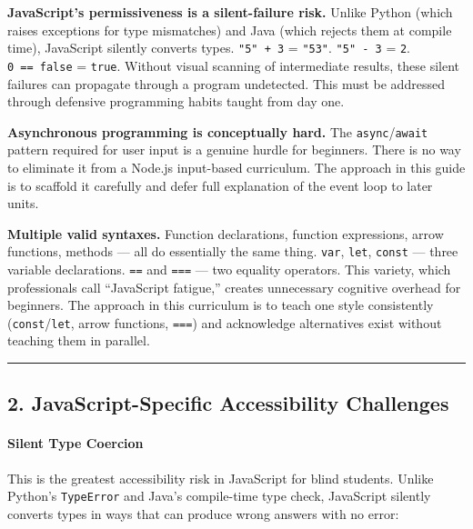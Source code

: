 \documentclass[
  justified,
  openright,
]{tufte-book}
\let\subsubsection\paragraph
\let\paragraph\paragraph
\let\subsubsection\paragraph
\let\paragraph\paragraph
\begin{document}
\textbf{JavaScript's permissiveness is a silent-failure risk.} Unlike
Python (which raises exceptions for type mismatches) and Java (which
rejects them at compile time), JavaScript silently converts types.
\texttt{"5"\ +\ 3} = \texttt{"53"}. \texttt{"5"\ -\ 3} = \texttt{2}.
\texttt{0\ ==\ false} = \texttt{true}. Without visual scanning of
intermediate results, these silent failures can propagate through a
program undetected. This must be addressed through defensive programming
habits taught from day one.

\textbf{Asynchronous programming is conceptually hard.} The
\texttt{async}/\texttt{await} pattern required for user input is a
genuine hurdle for beginners. There is no way to eliminate it from a
Node.js input-based curriculum. The approach in this guide is to
scaffold it carefully and defer full explanation of the event loop to
later units.

\textbf{Multiple valid syntaxes.} Function declarations, function
expressions, arrow functions, methods --- all do essentially the same
thing. \texttt{var}, \texttt{let}, \texttt{const} --- three variable
declarations. \texttt{==} and \texttt{===} --- two equality operators.
This variety, which professionals call ``JavaScript fatigue,'' creates
unnecessary cognitive overhead for beginners. The approach in this
curriculum is to teach one style consistently
(\texttt{const}/\texttt{let}, arrow functions, \texttt{===}) and
acknowledge alternatives exist without teaching them in parallel.

\begin{center}\rule{0.5\linewidth}{0.5pt}\end{center}

\subsection{2. JavaScript-Specific Accessibility
Challenges}\label{javascript-specific-accessibility-challenges}

\subsubsection{Silent Type Coercion}\label{silent-type-coercion}

This is the greatest accessibility risk in JavaScript for blind
students. Unlike Python's \texttt{TypeError} and Java's compile-time
type check, JavaScript silently converts types in ways that can produce
wrong answers with no error:
\end{document}
